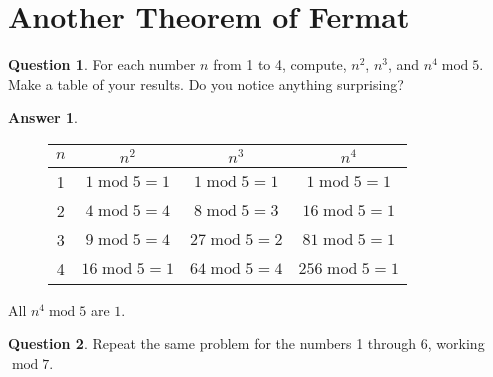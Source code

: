 \documentclass[article, 12pt]{article}
\theoremstyle{definition}
\newtheorem{question}{Question}
\newtheorem{answer}{Answer}
\newcommand{\Mod}[1]{\;\mathrm{mod}\; #1} %
\begin{document}
    \section{Another Theorem of Fermat}
    \begin{question}
        For each number $n$ from 1 to 4, compute, $n^2$, $n^3$, and $n^4 \Mod{5}$. Make a table of your results. Do you notice anything surprising?
    \end{question}
    \begin{answer} \
        \begin{figure}[H]
            \centering
            \begin{tabular}{|c|c|c|c|}
                \hline
                $n$ & $n^2$ & $n^3$ & $n^4$ \\
                \hline
                1 & $ 1 \Mod{5} = 1 $ & $ 1 \Mod{5} = 1 $ & $ 1 \Mod{5} = 1 $\\
                2 & $ 4 \Mod{5} = 4 $ & $ 8 \Mod{5} = 3 $ & $ 16 \Mod{5} = 1 $\\
                3 & $ 9 \Mod{5} = 4 $ & $27 \Mod{5} = 2 $ & $81 \Mod{5} = 1 $\\
                4 & $ 16 \Mod{5} = 1 $ & $64 \Mod{5} = 4 $ & $256 \Mod{5} = 1 $ \\
                \hline
            \end{tabular}
        \end{figure}
        All $n^4 \Mod{5}$ are $1$. 
    \end{answer}
    \begin{question}
        Repeat the same problem for the numbers 1 through 6, working $\Mod{7}$.
    \end{question}
\end{document}

